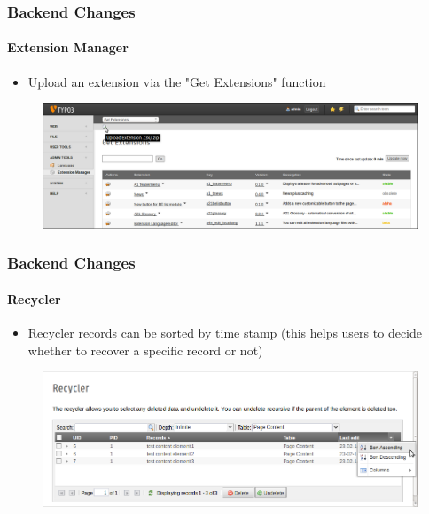 
\begin{frame}[fragile]
	\frametitle{Backend Changes}
	\framesubtitle{Extension Manager}

 	\begin{itemize}
		\item Upload an extension via the "Get Extensions" function
	\end{itemize}

	\begin{figure}
		\includegraphics[width=0.95\linewidth]{Images/BackendChanges/UploadExtension.png}
	\end{figure}

\end{frame}


\begin{frame}[fragile]
	\frametitle{Backend Changes}
	\framesubtitle{Recycler}

 	\begin{itemize}
		\item Recycler records can be sorted by time stamp\newline
			\small(this helps users to decide whether to recover a specific record or not)\normalsize
	\end{itemize}

	\begin{figure}
		\includegraphics[width=0.95\linewidth]{Images/BackendChanges/RecyclerSortRecord.png}
	\end{figure}

\end{frame}

